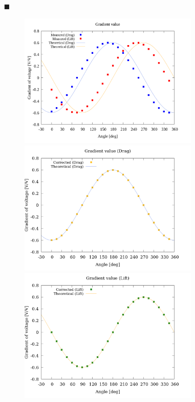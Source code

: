 \documentclass[twocolumn,a4j]{jsarticle}
\begin{document}
\newpage

\begin{itemize}
    \item [$\blacksquare$] \\
        \begin{figure}[htbp]
            \footnotesize
            \begin{center}
                \includegraphics[width=86mm]{../graphes/simulation_-150_-200/20/20_adjust-value.png}
                \caption{}
                \includegraphics[width=86mm]{../graphes/simulation_-150_-200/21/21-2_corrected_drag.png}
                \caption{}
                \includegraphics[width=86mm]{../graphes/simulation_-150_-200/21/21-2_corrected_lift.png}
                \caption{}
            \end{center}
        \end{figure}
\end{itemize}
\end{document}
